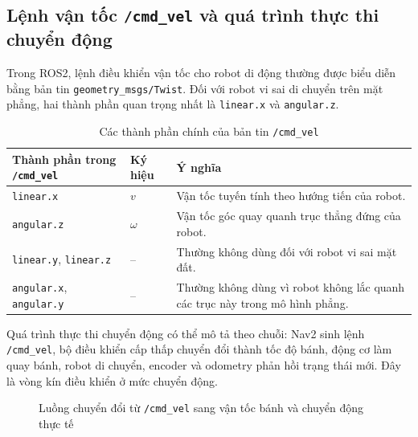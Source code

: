 \subsection{Lệnh vận tốc \texttt{/cmd\_vel} và quá trình thực thi chuyển động}
\label{subsec:cmd-vel-execution}

Trong ROS2, lệnh điều khiển vận tốc cho robot di động thường được biểu diễn bằng bản tin \texttt{geometry\_msgs/Twist}. Đối với robot vi sai di chuyển trên mặt phẳng, hai thành phần quan trọng nhất là \texttt{linear.x} và \texttt{angular.z}.

\begin{table}[H]
    \centering
    \caption{Các thành phần chính của bản tin \texttt{/cmd\_vel}}
    \label{tab:cmd-vel-components}
    \renewcommand{\arraystretch}{1.25}
    \small
    \begin{tabularx}{\textwidth}{|>{\raggedright\arraybackslash}p{}|>{\centering\arraybackslash}p{}|>{\raggedright\arraybackslash}X|}
        \hline
        \textbf{Thành phần trong \texttt{/cmd\_vel}} & \textbf{Ký hiệu} & \textbf{Ý nghĩa} \\
        \hline
        \texttt{linear.x} & $v$ & Vận tốc tuyến tính theo hướng tiến của robot. \\
        \hline
        \texttt{angular.z} & $\omega$ & Vận tốc góc quay quanh trục thẳng đứng của robot. \\
        \hline
        \texttt{linear.y}, \texttt{linear.z} & -- & Thường không dùng đối với robot vi sai mặt đất. \\
        \hline
        \texttt{angular.x}, \texttt{angular.y} & -- & Thường không dùng vì robot không lắc quanh các trục này trong mô hình phẳng. \\
        \hline
    \end{tabularx}
\end{table}

Quá trình thực thi chuyển động có thể mô tả theo chuỗi: Nav2 sinh lệnh \texttt{/cmd\_vel}, bộ điều khiển cấp thấp chuyển đổi thành tốc độ bánh, động cơ làm quay bánh, robot di chuyển, encoder và odometry phản hồi trạng thái mới. Đây là vòng kín điều khiển ở mức chuyển động.

\begin{figure}[H]
\centering
{}
\caption{Luồng chuyển đổi từ \texttt{/cmd\_vel} sang vận tốc bánh và chuyển động thực tế}
\label{fig:cmd-vel-to-wheel-motion}
\end{figure}

